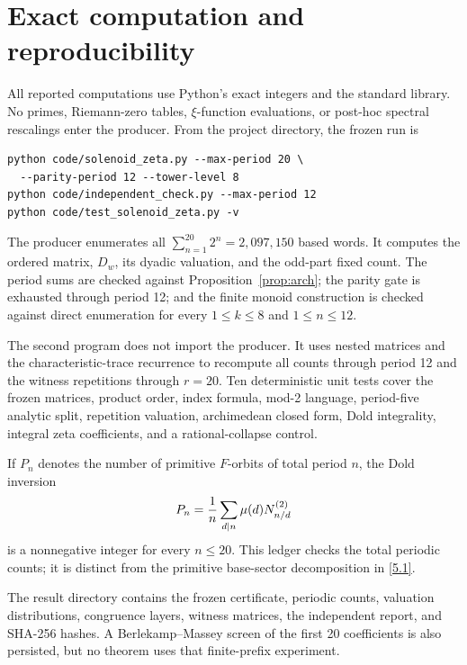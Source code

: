 \section{Exact computation and reproducibility}
\label{app:repro}

All reported computations use Python's exact integers and the standard
library.  No primes, Riemann-zero tables, \(\xi\)-function evaluations, or
post-hoc spectral rescalings enter the producer.  From the project directory,
the frozen run is
\begin{verbatim}
python code/solenoid_zeta.py --max-period 20 \
  --parity-period 12 --tower-level 8
python code/independent_check.py --max-period 12
python code/test_solenoid_zeta.py -v
\end{verbatim}

The producer enumerates all
\(\sum_{n=1}^{20}2^n=2{,}097{,}150\) based words.  It computes the ordered
matrix, \(D_w\), its dyadic valuation, and the odd-part fixed count.  The
period sums are checked against Proposition~\ref{prop:arch}; the parity gate
is exhausted through period 12; and the finite monoid construction is checked
against direct enumeration for every \(1\le k\le8\) and
\(1\le n\le12\).

The second program does not import the producer.  It uses nested matrices and
the characteristic-trace recurrence to recompute all counts through period
12 and the witness repetitions through \(r=20\).  Ten deterministic unit
tests cover the frozen matrices, product order, index formula, mod-2 language,
period-five analytic split, repetition valuation, archimedean closed form,
Dold integrality, integral zeta coefficients, and a rational-collapse control.

If \(P_n\) denotes the number of primitive \(F\)-orbits of total period
\(n\), the Dold inversion
\[
 P_n=\frac1n\sum_{d\mid n}\mu(d)N^{(2)}_{n/d}
\]
is a nonnegative integer for every \(n\le20\).  This ledger checks the total
periodic counts; it is distinct from the primitive base-sector decomposition
in \eqref{5.1}.

The result directory contains the frozen certificate, periodic counts,
valuation distributions, congruence layers, witness matrices, the independent
report, and SHA-256 hashes.  A Berlekamp--Massey screen of the first 20
coefficients is also persisted, but no theorem uses that finite-prefix
experiment.
